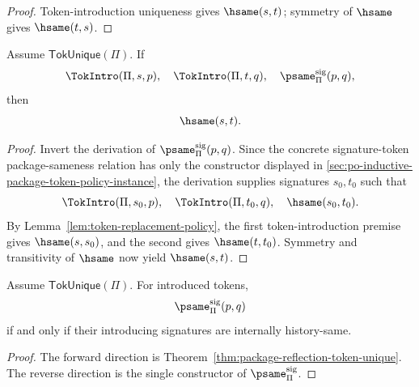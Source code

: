\begin{proof}
Token-introduction uniqueness gives \(\hsame(s,t)\); symmetry of \(\hsame\) gives \(\hsame(t,s)\).
\end{proof}

\begin{theorem}
\label{thm:package-reflection-token-unique}
Assume \(\mathsf{TokUnique}(\Pi)\). If
$$
  \TokIntro(\Pi,s,p),\quad
  \TokIntro(\Pi,t,q),\quad
  \psame_{\Pi}^{\mathrm{sig}}(p,q),
$$
then
$$
  \hsame(s,t).
$$
\end{theorem}

\begin{proof}
Invert the derivation of \(\psame_{\Pi}^{\mathrm{sig}}(p,q)\). Since the concrete signature-token package-sameness relation has only the constructor displayed in \autoref{sec:po-inductive-package-token-policy-instance}, the derivation supplies signatures \(s_0,t_0\) such that
$$
  \TokIntro(\Pi,s_0,p),\quad
  \TokIntro(\Pi,t_0,q),\quad
  \hsame(s_0,t_0).
$$
By Lemma~\ref{lem:token-replacement-policy}, the first token-introduction premise gives \(\hsame(s,s_0)\), and the second gives \(\hsame(t,t_0)\). Symmetry and transitivity of \(\hsame\) now yield \(\hsame(s,t)\).
\end{proof}

\begin{corollary}
\label{cor:exact-package-sameness}
Assume \(\mathsf{TokUnique}(\Pi)\). For introduced tokens,
$$
  \psame_{\Pi}^{\mathrm{sig}}(p,q)
$$
if and only if their introducing signatures are internally history-same.
\end{corollary}

\begin{proof}
The forward direction is Theorem~\ref{thm:package-reflection-token-unique}. The reverse direction is the single constructor of \(\psame_{\Pi}^{\mathrm{sig}}\).
\end{proof}


